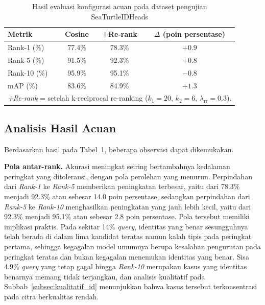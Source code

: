 \begin{table}[htbp]
    \centering
    \caption{Hasil evaluasi konfigurasi acuan pada dataset pengujian SeaTurtleIDHeads}
    \label{tab:baseline_results}
    \renewcommand{\arraystretch}{1.35}
    \begin{tabular}{ l  c  c  c }
        \hline
        \textbf{Metrik} & \textbf{Cosine} & \textbf{+Re-rank} & \textbf{$\Delta$ (poin persentase)}                                                   \\
        \hline
        Rank-1  (\%)    & 77.4\%          & 78.3\%            & $+0{.}9$                                                                              \\
        Rank-5  (\%)    & 91.5\%          & 92.3\%            & $+0{.}8$                                                                              \\
        Rank-10 (\%)    & 95.9\%          & 95.1\%            & $-0{.}8$                                                                              \\
        mAP     (\%)    & 83.6\%          & 84.9\%            & $+1{.}3$                                                                              \\
        \hline
        \multicolumn{4}{l}{\footnotesize \textit{+Re-rank} = setelah k-reciprocal re-ranking ($k_1{=}20$, $k_2{=}6$, $\lambda_{\text{rr}}{=}0{.}3$).} \\
    \end{tabular}
\end{table}

\subsection{Analisis Hasil Acuan}

Berdasarkan hasil pada Tabel~\ref{tab:baseline_results}, beberapa observasi dapat dikemukakan.

\textbf{Pola antar-rank.} Akurasi meningkat seiring bertambahnya kedalaman peringkat yang ditoleransi, dengan pola perolehan yang menurun. Perpindahan dari \textit{Rank-1} ke \textit{Rank-5} memberikan peningkatan terbesar, yaitu dari 78.3\% menjadi 92.3\% atau sebesar 14.0 poin persentase, sedangkan perpindahan dari \textit{Rank-5} ke \textit{Rank-10} menghasilkan peningkatan yang jauh lebih kecil, yaitu dari 92.3\% menjadi 95.1\% atau sebesar 2.8 poin persentase. Pola tersebut memiliki implikasi praktis. Pada sekitar 14\% \textit{query}, identitas yang benar sesungguhnya telah berada di dalam lima kandidat teratas namun kalah tipis pada peringkat pertama, sehingga kegagalan model umumnya berupa kesalahan pengurutan pada peringkat teratas dan bukan kegagalan menemukan identitas yang benar. Sisa 4.9\% \textit{query} yang tetap gagal hingga \textit{Rank-10} merupakan kasus yang identitas benarnya memang tidak terjangkau, dan analisis kualitatif pada Subbab~\ref{subsec:kualitatif_id} menunjukkan bahwa kasus tersebut terkonsentrasi pada citra berkualitas rendah.

